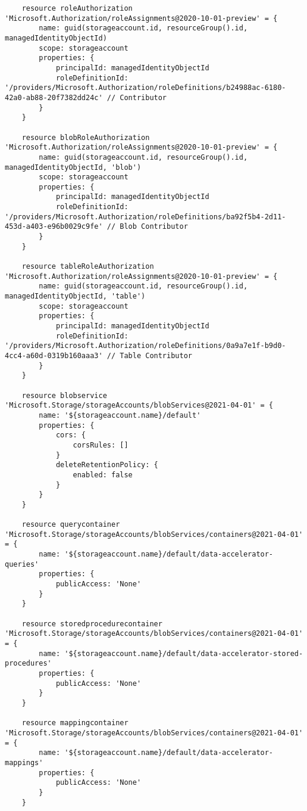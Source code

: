 \documentclass[dutch,dit,thesis]{hogentreport}
\begin{document}
\begin{lstlisting}
    resource roleAuthorization 'Microsoft.Authorization/roleAssignments@2020-10-01-preview' = {
        name: guid(storageaccount.id, resourceGroup().id, managedIdentityObjectId)
        scope: storageaccount
        properties: {
            principalId: managedIdentityObjectId
            roleDefinitionId: '/providers/Microsoft.Authorization/roleDefinitions/b24988ac-6180-42a0-ab88-20f7382dd24c' // Contributor
        }
    }

    resource blobRoleAuthorization 'Microsoft.Authorization/roleAssignments@2020-10-01-preview' = {
        name: guid(storageaccount.id, resourceGroup().id, managedIdentityObjectId, 'blob')
        scope: storageaccount
        properties: {
            principalId: managedIdentityObjectId
            roleDefinitionId: '/providers/Microsoft.Authorization/roleDefinitions/ba92f5b4-2d11-453d-a403-e96b0029c9fe' // Blob Contributor
        }
    }

    resource tableRoleAuthorization 'Microsoft.Authorization/roleAssignments@2020-10-01-preview' = {
        name: guid(storageaccount.id, resourceGroup().id, managedIdentityObjectId, 'table')
        scope: storageaccount
        properties: {
            principalId: managedIdentityObjectId
            roleDefinitionId: '/providers/Microsoft.Authorization/roleDefinitions/0a9a7e1f-b9d0-4cc4-a60d-0319b160aaa3' // Table Contributor
        }
    }

    resource blobservice 'Microsoft.Storage/storageAccounts/blobServices@2021-04-01' = {
        name: '${storageaccount.name}/default'
        properties: {
            cors: {
                corsRules: []
            }
            deleteRetentionPolicy: {
                enabled: false
            }
        }
    }

    resource querycontainer 'Microsoft.Storage/storageAccounts/blobServices/containers@2021-04-01' = {
        name: '${storageaccount.name}/default/data-accelerator-queries'
        properties: {
            publicAccess: 'None'
        }
    }

    resource storedprocedurecontainer 'Microsoft.Storage/storageAccounts/blobServices/containers@2021-04-01' = {
        name: '${storageaccount.name}/default/data-accelerator-stored-procedures'
        properties: {
            publicAccess: 'None'
        }
    }

    resource mappingcontainer 'Microsoft.Storage/storageAccounts/blobServices/containers@2021-04-01' = {
        name: '${storageaccount.name}/default/data-accelerator-mappings'
        properties: {
            publicAccess: 'None'
        }
    }


\end{lstlisting}
\end{document}
